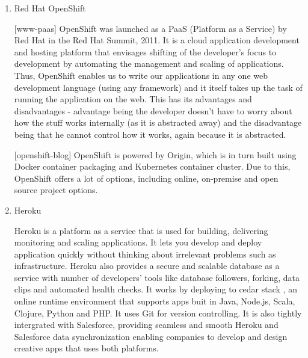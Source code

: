 \begin{enumerate}
\item {} 
Red Hat OpenShift

{[}www-paas{]} OpenShift was launched as a PaaS (Platform as a
Service) by Red Hat in the Red Hat Summit, 2011.
\label{\detokenize{i524/technologies:id165}}{\hyperref[\detokenize{i524/technologies:www-developers-openshift}]{\sphinxcrossref{{[}144{]}}}} It is a cloud application
development and hosting platform that envisages shifting of the
developer's focus to development by automating the management and
scaling of applications.  Thus, \label{\detokenize{i524/technologies:id166}}{\hyperref[\detokenize{i524/technologies:www-openshift}]{\sphinxcrossref{{[}145{]}}}} OpenShift
enables us to write our applications in any one web development
language (using any framework) and it itself takes up the task of
running the application on the web.  This has its advantages and
disadvantages - advantage being the developer doesn't have to
worry about how the stuff works internally (as it is abstracted
away) and the disadvantage being that he cannot control how it
works, again because it is abstracted.

{[}openshift-blog{]} OpenShift is powered by Origin, which is in
turn built using Docker container packaging and Kubernetes
container cluster.  Due to this, OpenShift offers a lot of
options, including online, on-premise and open source project
options.

\item {} 
Heroku

Heroku \label{\detokenize{i524/technologies:id168}}{\hyperref[\detokenize{i524/technologies:www-heroku}]{\sphinxcrossref{{[}146{]}}}} is a platform as a service that is used
for building, delivering monitoring and scaling applications. It
lets you develop and deploy application quickly without thinking
about irrelevant problems such as infrastructure. Heroku also
provides a secure and scalable database as a service with number
of developers’ tools like database followers, forking, data clips
and automated health checks. It works by deploying to cedar stack
\label{\detokenize{i524/technologies:id169}}{\hyperref[\detokenize{i524/technologies:www-cedar}]{\sphinxcrossref{{[}147{]}}}}, an online runtime environment that supports
apps buit in Java, Node.js, Scala, Clojure, Python and PHP. It
uses Git for version controlling. It is also tightly intergrated
with Salesforce, providing seamless and smooth Heroku and
Salesforce data synchronization enabling companies to develop and
design creative apps that uses both platforms.


\end{enumerate}

